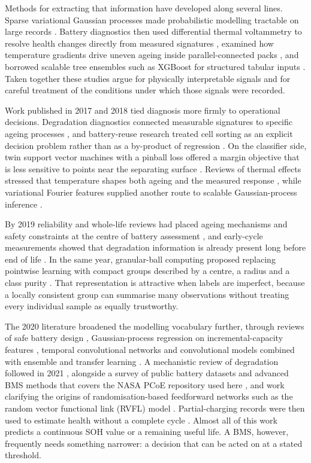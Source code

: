 \documentclass[final,5p,times,twocolumn]{elsarticle}
\begin{document}
Methods for extracting that information have developed along several lines. Sparse variational Gaussian processes made probabilistic modelling tractable on large records \cite{hensman2015}. Battery diagnostics then used differential thermal voltammetry to resolve health changes directly from measured signatures \cite{merla2016}, examined how temperature gradients drive uneven ageing inside parallel-connected packs \cite{yang2016}, and borrowed scalable tree ensembles such as XGBoost for structured tabular inputs \cite{chen2016xgb}. Taken together these studies argue for physically interpretable signals and for careful treatment of the conditions under which those signals were recorded.

Work published in 2017 and 2018 tied diagnosis more firmly to operational decisions. Degradation diagnostics connected measurable signatures to specific ageing processes \cite{birkl2017}, and battery-reuse research treated cell sorting as an explicit decision problem rather than as a by-product of regression \cite{chen2017reuse}. On the classifier side, twin support vector machines with a pinball loss offered a margin objective that is less sensitive to points near the separating surface \cite{xu2017twin}. Reviews of thermal effects stressed that temperature shapes both ageing and the measured response \cite{ma2018}, while variational Fourier features supplied another route to scalable Gaussian-process inference \cite{hensman2018}.

By 2019 reliability and whole-life reviews had placed ageing mechanisms and safety constraints at the centre of battery assessment \cite{gandoman2019,han2019,li2019}, and early-cycle measurements showed that degradation information is already present long before end of life \cite{severson2019}. In the same year, granular-ball computing proposed replacing pointwise learning with compact groups described by a centre, a radius and a class purity \cite{xia2019gb}. That representation is attractive when labels are imperfect, because a locally consistent group can summarise many observations without treating every individual sample as equally trustworthy.

The 2020 literature broadened the modelling vocabulary further, through reviews of safe battery design \cite{duan2020}, Gaussian-process regression on incremental-capacity features \cite{li2020gpr}, temporal convolutional networks \cite{zhou2020} and convolutional models combined with ensemble and transfer learning \cite{shen2020}. A mechanistic review of degradation followed in 2021 \cite{edge2021}, alongside a survey of public battery datasets and advanced BMS methods that covers the NASA PCoE repository used here \cite{hasib2021}, and work clarifying the origins of randomisation-based feedforward networks such as the random vector functional link (RVFL) model \cite{suganthan2021}. Partial-charging records were then used to estimate health without a complete cycle \cite{deng2022}. Almost all of this work predicts a continuous SOH value or a remaining useful life. A BMS, however, frequently needs something narrower: a decision that can be acted on at a stated threshold.
\end{document}
